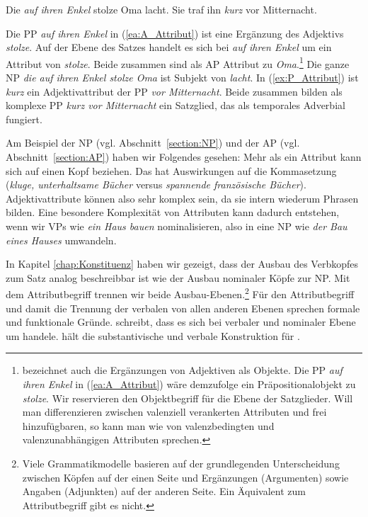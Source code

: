 \ea \label{ea:XAttribute}
\ea \label{ea:A_Attribut} Die \textit{auf ihren Enkel} stolze Oma lacht.
\ex \label{ex:P_Attribut} Sie traf ihn \textit{kurz} vor Mitternacht.
\z 
\z 

Die PP \textit{auf ihren Enkel} in (\ref{ea:A_Attribut}) ist eine Ergänzung des Adjektivs \textit{stolze}. Auf der Ebene des Satzes handelt es sich bei \textit{auf ihren Enkel} um ein Attribut von \textit{stolze}. Beide zusammen sind als AP Attribut zu \textit{Oma}.\footnote{\citet[68]{Musan2021_SGA} bezeichnet auch die Ergänzungen von Adjektiven als Objekte. Die PP \textit{auf ihren Enkel} in (\ref{ea:A_Attribut}) wäre demzufolge ein Präpositionalobjekt zu \textit{stolze}. Wir reservieren den Objektbegriff für die Ebene der Satzglieder. Will man differenzieren zwischen valenziell verankerten Attributen und frei hinzufügbaren, so kann man wie \citet[493]{HelbigBuscha} von valenzbedingten und valenzunabhängigen Attributen sprechen.} Die ganze NP \textit{die auf ihren Enkel stolze Oma} ist Subjekt von \textit{lacht}. In (\ref{ex:P_Attribut}) ist \textit{kurz} ein Adjektivattribut der PP \textit{vor Mitternacht}. Beide zusammen bilden als komplexe PP \textit{kurz vor Mitternacht} ein Satzglied, das als temporales Adverbial fungiert.  

Am Beispiel der NP (vgl. Abschnitt~\ref{section:NP}) und der AP (vgl. Abschnitt~\ref{section:AP}) haben wir Folgendes gesehen: Mehr als ein Attribut kann sich auf einen Kopf beziehen. Das hat Auswirkungen auf die Kommasetzung (\textit{kluge, unterhaltsame Bücher} versus \textit{spannende französische Bücher}). Adjektivattribute können also sehr komplex sein, da sie intern wiederum Phrasen bilden. Eine besondere Komplexität von Attributen kann dadurch entstehen, wenn wir VPs wie \textit{ein Haus bauen} nominalisieren, also in eine NP wie \textit{der Bau eines Hauses} umwandeln.

In Kapitel \ref{chap:Konstituenz} haben wir gezeigt, dass der Ausbau des Verbkopfes zum Satz analog beschreibbar ist wie der Ausbau nominaler Köpfe zur NP. Mit dem Attributbegriff trennen wir beide Ausbau-Ebenen.\footnote{Viele Grammatikmodelle basieren auf der grundlegenden Unterscheidung zwischen Köpfen auf der einen Seite und Ergänzungen (Argumenten) sowie Angaben (Adjunkten) auf der anderen Seite. Ein Äquivalent zum Attributbegriff gibt es nicht.} Für den Attributbegriff und damit die Trennung der verbalen von allen anderen Ebenen sprechen formale und funktionale Gründe. \citet[46]{Eichinger1995} schreibt, dass es sich bei verbaler und nominaler Ebene um  handele. \citet[254]{Welke2011} hält die substantivische und verbale Konstruktion für .

